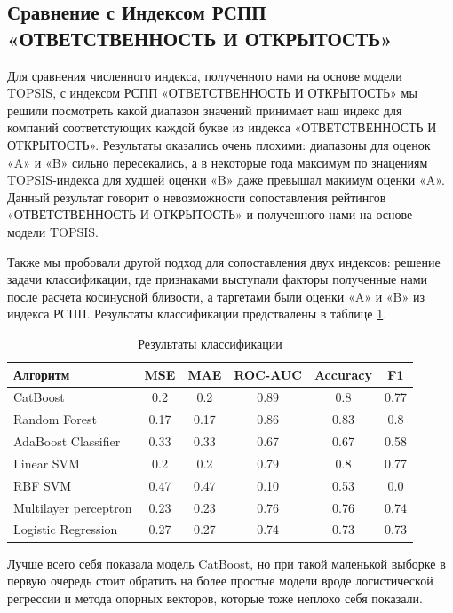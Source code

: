 \documentclass[a4paper, 14pt]{extarticle}
\begin{document}
\subsection{Сравнение с Индексом РСПП «ОТВЕТСТВЕННОСТЬ
И ОТКРЫТОСТЬ»}

Для сравнения численного индекса, полученного нами на основе модели TOPSIS, с индексом РСПП «ОТВЕТСТВЕННОСТЬ
И ОТКРЫТОСТЬ» мы решили посмотреть какой диапазон значений принимает наш индекс для компаний соответстующих каждой букве из индекса «ОТВЕТСТВЕННОСТЬ И ОТКРЫТОСТЬ». Результаты оказались очень плохими: диапазоны для оценок «A» и «B» сильно пересекались, а в некоторые года максимум по знацениям TOPSIS-индекса для худшей оценки «B» даже превышал макимум оценки «A». Данный результат говорит о невозможности сопоставления рейтингов «ОТВЕТСТВЕННОСТЬ И ОТКРЫТОСТЬ» и полученного нами на основе модели TOPSIS.

Также мы пробовали другой подход для сопоставления двух индексов: решение задачи классификации, где признаками выступали факторы полученные нами после расчета косинусной близости, а таргетами были оценки «A» и «B» из индекса РСПП. Результаты классификации предствалены в таблице \ref{tab:t2}.
\begin{table}
    \begin{center}
        \begin{tabular}{ | l | c | c | c | c | c |}
        \hline
        Алгоритм & MSE & MAE & ROC-AUC & Accuracy & F1 \\ \hline
        CatBoost & 0.2 & 0.2 & 0.89 & 0.8 & 0.77 \\ \hline
        Random Forest & 0.17 & 0.17 & 0.86 & 0.83 & 0.8 \\ \hline
        AdaBoost Classifier & 0.33 & 0.33 & 0.67 & 0.67 & 0.58 \\ \hline
        Linear SVM & 0.2 & 0.2 & 0.79 & 0.8 & 0.77 \\ \hline
        RBF SVM & 0.47 & 0.47 & 0.10 & 0.53 & 0.0 \\ \hline
        Multilayer perceptron & 0.23 & 0.23 & 0.76 & 0.76 & 0.74 \\ \hline
        Logistic Regression & 0.27 & 0.27 & 0.74 & 0.73 & 0.73 \\ \hline
        \end{tabular}
        \caption{Результаты классификации}
        \label{tab:t2}
    \end{center}
\end{table}

Лучше всего себя показала модель CatBoost, но при такой маленькой выборке в первую очередь стоит обратить на более простые модели вроде логистической регрессии и метода опорных векторов, которые тоже неплохо себя показали.
\end{document}
